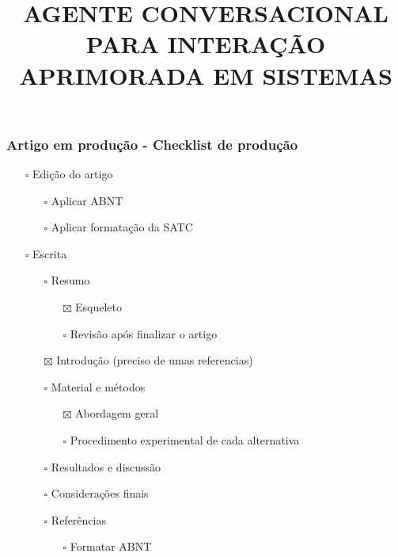 \documentclass[
]{article}
\title{\textbf{AGENTE CONVERSACIONAL PARA INTERAÇÃO APRIMORADA EM
SISTEMAS}}
\author{}
\date{}
\providecommand{\tightlist}{%
  \setlength{\itemsep}{0pt}\setlength{\parskip}{0pt}}
\begin{document}
\maketitle

\subsubsection{Artigo em produção - Checklist de
produção}\label{artigo-em-produuxe7uxe3o---checklist-de-produuxe7uxe3o}

\begin{itemize}
\tightlist
\item[$\square$]
  Edição do artigo

  \begin{itemize}
  \tightlist
  \item[$\square$]
    Aplicar ABNT
  \item[$\square$]
    Aplicar formatação da SATC
  \end{itemize}
\item[$\square$]
  Escrita

  \begin{itemize}
  \tightlist
  \item[$\square$]
    Resumo

    \begin{itemize}
    \tightlist
    \item[$\boxtimes$]
      Esqueleto
    \item[$\square$]
      Revisão após finalizar o artigo
    \end{itemize}
  \item[$\boxtimes$]
    Introdução (preciso de umas referencias)
  \item[$\square$]
    Material e métodos

    \begin{itemize}
    \tightlist
    \item[$\boxtimes$]
      Abordagem geral
    \item[$\square$]
      Procedimento experimental de cada alternativa
    \end{itemize}
  \item[$\square$]
    Resultados e discussão
  \item[$\square$]
    Considerações finais
  \item[$\square$]
    Referências

    \begin{itemize}
    \tightlist
    \item[$\square$]
      Formatar ABNT
    \end{itemize}
  \end{itemize}
\end{itemize}
\end{document}
